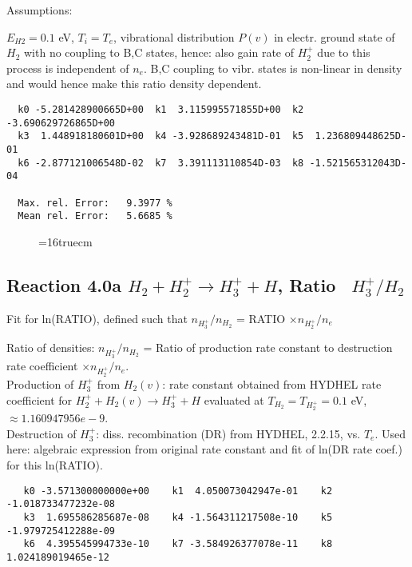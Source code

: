 \documentclass[12pt,dvipdfmx]{article}
\begin{document}
Assumptions:

$E_{H2} = 0.1$ eV, $T_i = T_e$, vibrational distribution $P(v)$ in electr. ground state of $H_2$ with
no coupling to B,C states,
hence: also gain rate of $H_2^+$ due to this process is independent of $n_e$.
B,C coupling to vibr. states is non-linear in density and would hence make this ratio density dependent.

\begin{small}\begin{verbatim}
  k0 -5.281428900665D+00  k1  3.115995571855D+00  k2 -3.690629726865D+00
  k3  1.448918180601D+00  k4 -3.928689243481D-01  k5  1.236809448625D-01
  k6 -2.877121006548D-02  k7  3.391113110854D-03  k8 -1.521565312043D-04

  Max. rel. Error:   9.3977 %
  Mean rel. Error:   5.6685 %
\end{verbatim}\end{small}


\begin{figure} \label{2.0a}
\epsfxsize=16truecm
\end{figure}

\newpage
\subsection{
Reaction 4.0a   $ H_2 + H_2^+ \rightarrow H_3^+ + H$, Ratio \ $H_3^+/H_2$
}

Fit for ln(RATIO), defined such that $n_{H_3^+}/n_{H_2}$ = RATIO $\times n_{H_2^+}/n_e$

 Ratio of densities: $n_{H_3^+}/n_{H_2}$ = Ratio of production rate constant
 to destruction rate coefficient $\times n_{H_2^+}/n_e$. \\
  Production of $H_3^+$ from $H_2(v)$:  rate constant obtained from HYDHEL rate coefficient
  for $ H_2^+ + H_2(v) \rightarrow H_3^+ + H$
  evaluated at $T_{H_2} = T_{H_2^+} = 0.1$ eV,  $ \approx 1.160947956 e-9$. \\
  Destruction of $H_3^+$: diss. recombination (DR) from HYDHEL, 2.2.15, vs. $T_e$.
  Used here: algebraic expression from original rate constant and fit of ln(DR rate coef.)
  for this ln(RATIO).

\begin{small}\begin{verbatim}
   k0 -3.571300000000e+00    k1  4.050073042947e-01    k2 -1.018733477232e-08
   k3  1.695586285687e-08    k4 -1.564311217508e-10    k5 -1.979725412288e-09
   k6  4.395545994733e-10    k7 -3.584926377078e-11    k8  1.024189019465e-12
\end{verbatim}\end{small}
\newpage
\end{document}
